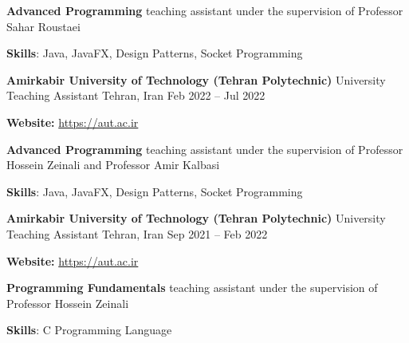 \documentclass[]{awesome-cv}
\begin{document}
\begin{cventries}
{\begin{cvitems}
		\vspace{1mm}
		\item[] {\hspace{-9mm}}\textbf{Advanced Programming} teaching assistant under the supervision of Professor Sahar Roustaei
		\vspace{1mm}
        \item {\textbf{Skills}: Java, JavaFX, Design Patterns, Socket Programming}
        \vspace{1mm}
	\end{cvitems}}
    \cventry
    {\textbf{Amirkabir University of Technology (Tehran Polytechnic)}}
	{University Teaching Assistant}
	{Tehran, Iran}
	{Feb 2022 – Jul 2022}
	{\begin{cvitems}
        \vspace{1mm}
        \item[] {\hspace{-9mm}\textbf{Website:} \href{https://aut.ac.ir}{\textcolor{awesome}{https://aut.ac.ir}}}
		\vspace{1mm}
		\item[] {\hspace{-9mm}}\textbf{Advanced Programming} teaching assistant under the supervision of Professor Hossein Zeinali and Professor Amir Kalbasi
		\vspace{1mm}
        \item {\textbf{Skills}: Java, JavaFX, Design Patterns, Socket Programming}
        \vspace{1mm}
	\end{cvitems}}
    \cventry
    {\textbf{Amirkabir University of Technology (Tehran Polytechnic)}}
	{University Teaching Assistant}
	{Tehran, Iran}
	{Sep 2021 – Feb 2022}
	{\begin{cvitems}
        \vspace{1mm}
        \item[] {\hspace{-9mm}\textbf{Website:} \href{https://aut.ac.ir}{\textcolor{awesome}{https://aut.ac.ir}}}
		\vspace{1mm}
		\item[] {\hspace{-9mm}}\textbf{Programming Fundamentals} teaching assistant under the supervision of Professor Hossein Zeinali
		\vspace{1mm}
        \item {\textbf{Skills}: C Programming Language}
        \vspace{1mm}
	\end{cvitems}}
\end{cventries}
\end{document}
